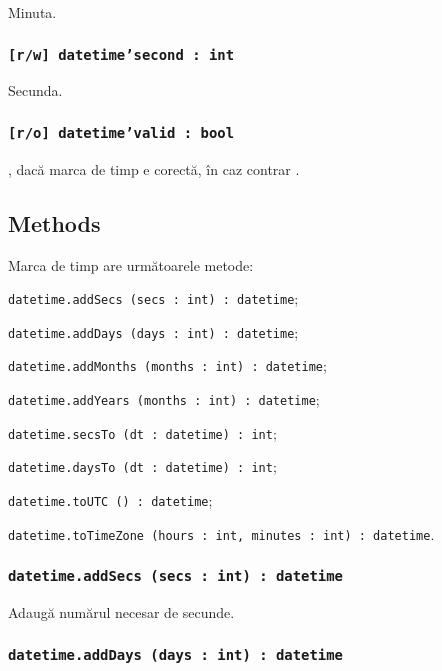 Minuta.

\subsubsection{\texttt{[r/w] datetime'second : int}}

Secunda.

\subsubsection{\texttt{[r/o] datetime'valid : bool}}

\true, dacă marca de timp e corectă, în caz contrar \false.

\subsection{Methods}

Marca de timp are următoarele metode:
\begin{icItems}
	\item \texttt{datetime.addSecs (secs : int) : datetime};
	\item \texttt{datetime.addDays (days : int) : datetime};
	\item \texttt{datetime.addMonths (months : int) : datetime};
	\item \texttt{datetime.addYears (months : int) : datetime};
	\item \texttt{datetime.secsTo (dt : datetime) : int};
	\item \texttt{datetime.daysTo (dt : datetime) : int};
	\item \texttt{datetime.toUTC () : datetime};
	\item \texttt{datetime.toTimeZone (hours : int, minutes : int) : datetime}.
\end{icItems}

\subsubsection{\texttt{datetime.addSecs (secs : int) : datetime}}

Adaugă numărul necesar de secunde.

\subsubsection{\texttt{datetime.addDays (days : int) : datetime}}

